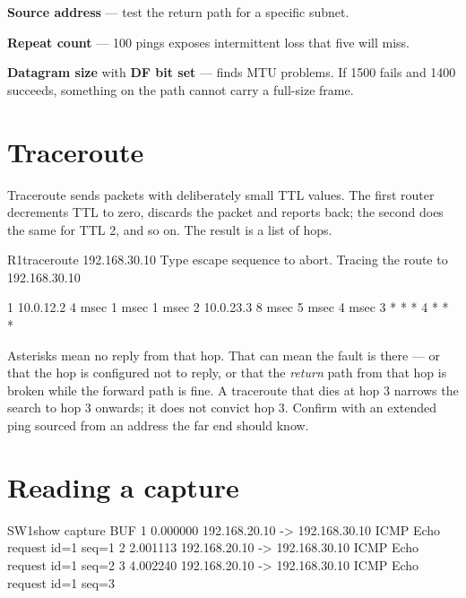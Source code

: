 \begin{tight}
  \item \textbf{Source address} --- test the return path for a specific subnet.
  \item \textbf{Repeat count} --- 100 pings exposes intermittent loss that five
        will miss.
  \item \textbf{Datagram size} with \textbf{DF bit set} --- finds MTU problems.
        If 1500 fails and 1400 succeeds, something on the path cannot carry a
        full-size frame.
\end{tight}

\section{Traceroute}

Traceroute sends packets with deliberately small TTL values. The first router
decrements TTL to zero, discards the packet and reports back; the second does the
same for TTL 2, and so on. The result is a list of hops.

\begin{verify}{R1}{traceroute 192.168.30.10}
Type escape sequence to abort.
Tracing the route to 192.168.30.10

  1 10.0.12.2 4 msec 1 msec 1 msec
  2 10.0.23.3 8 msec 5 msec 4 msec
  3  *  *  *
  4  *  *  *
\end{verify}

\begin{alertbox}
Asterisks mean no reply from that hop. That can mean the fault is there --- or
that the hop is configured not to reply, or that the \emph{return} path from that
hop is broken while the forward path is fine. A traceroute that dies at hop 3
narrows the search to hop 3 onwards; it does not convict hop 3. Confirm with an
extended ping sourced from an address the far end should know.
\end{alertbox}

\section{Reading a capture}

\begin{verify}{SW1}{show capture BUF}
   1  0.000000  192.168.20.10 -> 192.168.30.10  ICMP Echo request  id=1 seq=1
   2  2.001113  192.168.20.10 -> 192.168.30.10  ICMP Echo request  id=1 seq=2
   3  4.002240  192.168.20.10 -> 192.168.30.10  ICMP Echo request  id=1 seq=3
\end{verify}

